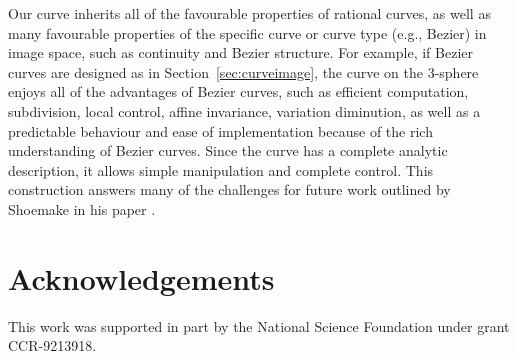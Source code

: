 Our curve inherits all of the favourable properties of rational curves,
as well as many favourable properties of the specific curve or curve type
(e.g., Bezier) in image space, such as continuity and Bezier structure.
For example, if Bezier curves are designed as in Section~\ref{sec:curveimage},
the curve on the 3-sphere enjoys all of the advantages of Bezier curves, such as
efficient computation, subdivision, local control, affine invariance, 
variation diminution, as well as a predictable behaviour and ease of 
implementation because of the rich understanding of Bezier curves.
Since the curve has a complete analytic description, it allows
simple manipulation and complete control.
This construction answers many of the challenges for future work
outlined by Shoemake in his paper \cite{shoemake85}.


\parindent=-20mm

\section{Acknowledgements}

This work was supported in part
by the National Science Foundation under grant CCR-9213918.

